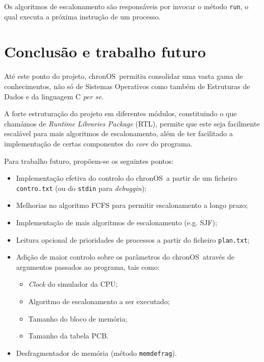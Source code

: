 \documentclass[a4paper,11pt,onecolumn,oneside]{article}
\newcommand{\chronOS}{\textsf{chronOS}}
\begin{document}
	Os algoritmos de escalonamento são responsáveis por invocar o método \verb|run|, o qual executa a próxima instrução de um processo.
	
	
	\section{Conclusão e trabalho futuro}
	\label{sec:con_futwork}
	
	Até este ponto do projeto, \chronOS~permitiu consolidar uma vasta gama de conhecimentos, não só de Sistemas Operativos como também de Estruturas de Dados e da linguagem C \textit{per se}.
	
	A forte estruturação do projeto em diferentes módulos, constituindo o que chamámos de \textit{Runtime Libraries Package} (RTL), permite que este seja facilmente escalável para mais algoritmos de escalonamento, além de ter facilitado a implementação de certas componentes do \textit{core} do programa.
	
	\vspace{0.6cm}
	
	Para trabalho futuro, propõem-se os seguintes pontos:
	
	\begin{itemize}
		\item Implementação efetiva do controlo do \chronOS~a partir de um ficheiro \texttt{contro.txt} (ou do \texttt{stdin} para \textit{debuggin});
		\item Melhorias no algoritmo \ac{FCFS} para permitir escalonamento a longo prazo;
		\item Implementação de mais algoritmos de escalonamento (e.g. \ac{SJF});
		\item Leitura opcional de prioridades de processos a partir do ficheiro \texttt{plan.txt};
		\item Adição de maior controlo sobre os parâmetros do \chronOS~através de argumentos passados ao programa, tais como:
		\begin{itemize}
			\item \textit{Clock} do simulador da \ac{CPU};
			\item Algoritmo de escalonamento a ser executado;
			\item Tamanho do bloco de memória;
			\item Tamanho da tabela \ac{PCB}.
		\end{itemize}
	
		\item Desfragmentador de memória (método \verb|memdefrag|).
	\end{itemize}
	
\end{document}
